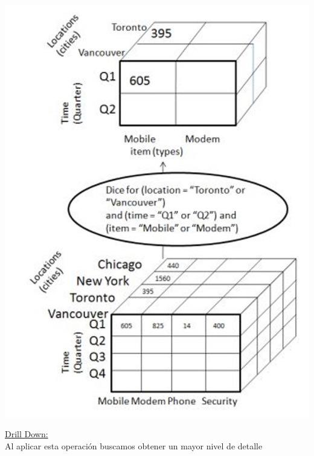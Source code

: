 \documentclass{fancyslides}
\begin{document}
\begin{frame}
\misc
{
  \begin{center}
  \includegraphics[scale=0.15]{dice}
  \end{center}
}
\end{frame}


\begin{frame}
\misc
{
  \underline{Drill Down:}\\
  Al aplicar esta operación buscamos obtener un mayor nivel de detalle
}
\end{frame}
\end{document}
